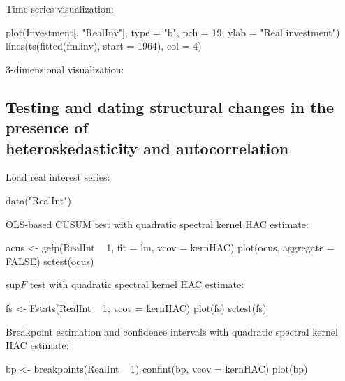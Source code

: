 \documentclass{Z}
\begin{document}
\begin{appendix}
Time-series visualization:
\begin{Schunk}
\begin{Sinput}
  plot(Investment[, "RealInv"], type = "b", pch = 19, ylab = "Real investment")
  lines(ts(fitted(fm.inv), start = 1964), col = 4)
\end{Sinput}
\end{Schunk}

3-dimensional visualization: %
\begin{Schunk}
\end{Schunk}

\subsection[Testing and dating structural changes in the presence of heteroskedasticity and autocorrelation]{Testing and dating structural changes in the presence of\\ heteroskedasticity and autocorrelation}

Load real interest series:
\begin{Schunk}
\begin{Sinput}
  data("RealInt")
\end{Sinput}
\end{Schunk}

OLS-based CUSUM test with quadratic spectral kernel HAC estimate:
\begin{Schunk}
\begin{Sinput}
  ocus <- gefp(RealInt ~ 1, fit = lm, vcov = kernHAC)
  plot(ocus, aggregate = FALSE)
  sctest(ocus)
\end{Sinput}
\end{Schunk}

sup$F$ test with quadratic spectral kernel HAC estimate:
\begin{Schunk}
\begin{Sinput}
  fs <- Fstats(RealInt ~ 1, vcov = kernHAC)
  plot(fs)
  sctest(fs)
\end{Sinput}
\end{Schunk}

Breakpoint estimation and confidence intervals
with quadratic spectral kernel HAC estimate:
\begin{Schunk}
\begin{Sinput}
  bp <- breakpoints(RealInt ~ 1)
  confint(bp, vcov = kernHAC)
  plot(bp)
\end{Sinput}
\end{Schunk}


\end{appendix}
\end{document}

